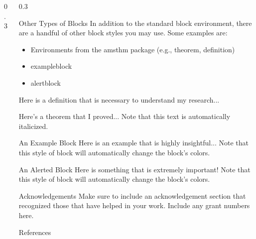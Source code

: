 \documentclass{msuposter}
\newcommand{\colwidth}{0.3\linewidth}
\begin{document}
\begin{frame}{}
\begin{columns}[t]
\begin{column}{\colwidth}
\end{column}


\begin{column}{\colwidth}

\begin{block}{Other Types of Blocks}
In addition to the standard {\ttfamily block} environment, there are a handful of other block styles you may use.  Some examples are:
\begin{itemize}
 \item Environments from the {\ttfamily amsthm} package (e.g., {\ttfamily theorem}, {\ttfamily definition})
 \item {\ttfamily exampleblock}
 \item {\ttfamily alertblock}
\end{itemize}
\end{block}

\begin{definition}[My Definition]
Here is a definition that is necessary to understand my research...
\end{definition}

\begin{theorem}
Here's a theorem that I proved...  Note that this text is automatically italicized.
\end{theorem}

\begin{exampleblock}{An Example Block}
Here is an example that is highly insightful...  Note that this style of block will automatically change the block's colors.
\end{exampleblock}

\begin{alertblock}{An Alerted Block}
Here is something that is extremely important!  Note that this style of block will automatically change the block's colors.
\end{alertblock}

\begin{block}{Acknowledgements}
Make sure to include an acknowledgement section that recognized those that have helped in your work. Include any grant numbers here. 
\end{block}

\begin{block}{References} %
\scriptsize


\end{block}

\end{column}

\end{columns}
\end{frame}
\end{document}
